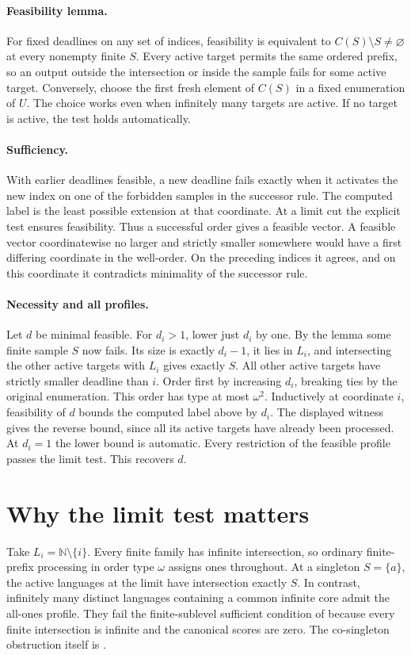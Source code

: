 \documentclass[11pt]{article}
\begin{document}
\paragraph{Feasibility lemma.} For fixed deadlines on any set of indices, feasibility is equivalent to $C(S)\setminus S\ne\varnothing$ at every nonempty finite $S$. Every active target permits the same ordered prefix, so an output outside the intersection or inside the sample fails for some active target. Conversely, choose the first fresh element of $C(S)$ in a fixed enumeration of $U$. The choice works even when infinitely many targets are active. If no target is active, the test holds automatically.

\paragraph{Sufficiency.} With earlier deadlines feasible, a new deadline fails exactly when it activates the new index on one of the forbidden samples in the successor rule. The computed label is the least possible extension at that coordinate. At a limit cut the explicit test ensures feasibility. Thus a successful order gives a feasible vector. A feasible vector coordinatewise no larger and strictly smaller somewhere would have a first differing coordinate in the well-order. On the preceding indices it agrees, and on this coordinate it contradicts minimality of the successor rule.

\paragraph{Necessity and all profiles.} Let $d$ be minimal feasible. For $d_i>1$, lower just $d_i$ by one. By the lemma some finite sample $S$ now fails. Its size is exactly $d_i-1$, it lies in $L_i$, and intersecting the other active targets with $L_i$ gives exactly $S$. All other active targets have strictly smaller deadline than $i$. Order first by increasing $d_i$, breaking ties by the original enumeration. This order has type at most $\omega^2$. Inductively at coordinate $i$, feasibility of $d$ bounds the computed label above by $d_i$. The displayed witness gives the reverse bound, since all its active targets have already been processed. At $d_i=1$ the lower bound is automatic. Every restriction of the feasible profile passes the limit test. This recovers $d$.

\section{Why the limit test matters}
Take $L_i=\mathbb N\setminus\{i\}$. Every finite family has infinite intersection, so ordinary finite-prefix processing in order type $\omega$ assigns ones throughout. At a singleton $S=\{a\}$, the active languages at the limit have intersection exactly $S$. In contrast, infinitely many distinct languages containing a common infinite core admit the all-ones profile. They fail the finite-sublevel sufficient condition of \cite[Theorem 11]{cp} because every finite intersection is infinite and the canonical scores are zero. The co-singleton obstruction itself is \cite[Proposition 12]{cp}.
\end{document}
